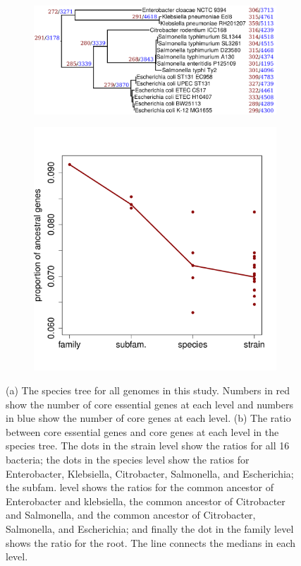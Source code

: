 \documentclass[12pt,letterpaper]{article}
\begin{document}
\begin{figure}
\captionsetup[subfigure]{justification=centering}
\begin{subfigure}{.6\textwidth}
  \centering
  \includegraphics[scale=0.12]{phylosift-aa-raxmlbootstrap-annotated.pdf}
  \caption{}
  \label{fig:tree}
\end{subfigure}
\begin{subfigure}{.4\textwidth}
  \centering
  \includegraphics[scale=0.4]{fitch.pdf}
  \caption{}
  \label{fig:fitch}
\end{subfigure}
\caption{(a) The species tree for all genomes in this study. Numbers in red show the number of core essential genes at each level and numbers in blue show the number of core genes at each level. (b) The ratio between core essential genes and core genes at each level in the species tree. The dots in the strain level show the ratios for all 16 bacteria; the dots in the species level show the ratios for Enterobacter, Klebsiella, Citrobacter, Salmonella, and Escherichia; the subfam. level shows the ratios for the common ancestor of Enterobacter and klebsiella, the common ancestor of Citrobacter and Salmonella, and the common ancestor of Citrobacter, Salmonella, and Escherichia; and finally the dot in the family level shows the ratio for the root. The line connects the medians in each level.}
\label{fig:essentiality-phylogeny}
\end{figure}
\end{document}
